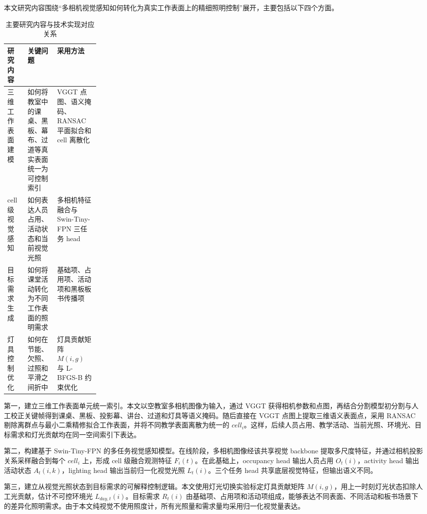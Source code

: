 \documentclass[UTF8,a4paper,zihao=-4]{ctexart}
\begin{document}
本文研究内容围绕“多相机视觉感知如何转化为真实工作表面上的精细照明控制”展开，主要包括以下四个方面。

\begin{table}[H]
  \centering
  \small
  \caption{主要研究内容与技术实现对应关系}
  \label{tab:research-content}
  \begin{tabularx}{\linewidth}{>{\raggedright\arraybackslash}p{0.22\linewidth}>{\raggedright\arraybackslash}X>{\raggedright\arraybackslash}X}
    \toprule
    研究内容 & 关键问题 & 采用方法 \\
    \midrule
    三维工作表面建模 & 如何将教室中的课桌、黑板、幕布、过道等真实表面统一为可控制索引 & VGGT 点图、语义掩码、RANSAC 平面拟合和 cell 离散化 \\
    cell 级视觉感知 & 如何表达人员占用、活动状态和当前视觉光照 & 多相机特征融合与 Swin-Tiny-FPN 三任务 head \\
    目标需求生成 & 如何将课堂活动转化为不同工作表面的照明需求 & 基础项、占用项、活动项和黑板板书传播项 \\
    灯具控制优化 & 如何在节能、欠照、过照和平滑之间折中 & 灯具贡献矩阵 $M(i,g)$ 与 L-BFGS-B 约束优化 \\
    \bottomrule
  \end{tabularx}
\end{table}

第一，建立三维工作表面单元统一索引。本文以空教室多相机图像为输入，通过 VGGT 获得相机参数和点图，再结合分割模型初分割与人工校正关键帧得到课桌、黑板、投影幕、讲台、过道和灯具等语义掩码。随后直接在 VGGT 点图上提取三维语义表面点，采用 RANSAC 剔除离群点与最小二乘精修拟合工作表面，并将不同教学表面离散为统一的 $cell_i$。这样，后续人员占用、教学活动、当前光照、环境光、目标需求和灯光贡献均在同一空间索引下表达。

第二，构建基于 Swin-Tiny-FPN 的多任务视觉感知模型。在线阶段，多相机图像经该共享视觉 backbone 提取多尺度特征，并通过相机投影关系采样融合到每个 $cell_i$ 上，形成 cell 级融合观测特征 $F_i(t)$。在此基础上，occupancy head 输出人员占用 $O_t(i)$，activity head 输出活动状态 $A_t(i,k)$，lighting head 输出当前归一化视觉光照 $L_t(i)$。三个任务 head 共享底层视觉特征，但输出语义不同。

第三，建立从视觉光照状态到目标需求的可解释控制逻辑。本文使用灯光切换实验标定灯具贡献矩阵 $M(i,g)$，用上一时刻灯光状态扣除人工光贡献，估计不可控环境光 $L_{day,t}(i)$。目标需求 $R_t(i)$ 由基础项、占用项和活动项组成，能够表达不同表面、不同活动和板书场景下的差异化照明需求。由于本文纯视觉不使用照度计，所有光照量和需求量均采用归一化视觉量表达。
\end{document}
